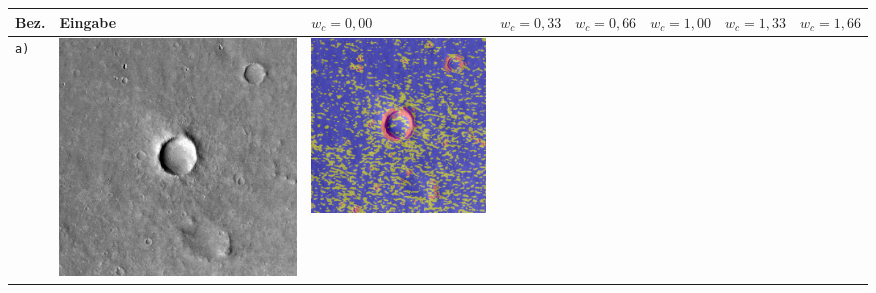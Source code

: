 \begin{table}[h!]
	\setlength\tabcolsep{0pt}
	\begin{tabularx}{\textwidth}{>{\centering}m{}
			>{\centering}m{}
			>{\centering}m{}
			>{\centering}m{}
			>{\centering}m{}
			>{\centering}m{}
			>{\centering}m{}
			>{\centering\arraybackslash}m{}}
		\toprule
		Bez. &
		Eingabe & 
		$w_c=0,00$ &
		$w_c=0,33$ &
		$w_c=0,66$ &
		$w_c=1,00$ &
		$w_c=1,33$ &
		$w_c=1,66$ \\
		
		\midrule
		\texttt{a)} &
		\includegraphics[width=0.9\linewidth]{images/p03/p03_01.png} &
		\includegraphics[width=0.9\linewidth]{images/gen/color_weight/p03_01.png_0.00.png} &

\end{tabularx}
\end{table}
